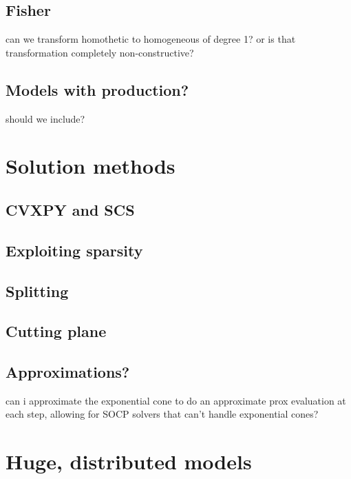\documentclass{article}
\begin{document}
\subsection{Fisher}
can we transform homothetic to homogeneous of degree 1? or is that transformation completely non-constructive?

\subsection{Models with production?}
should we include?

\section{Solution methods}

\subsection{CVXPY and SCS}
\subsection{Exploiting sparsity}
\subsection{Splitting}
\subsection{Cutting plane}
\subsection{Approximations?}
can i approximate the exponential cone to do an approximate prox evaluation
at each step, allowing for SOCP solvers that can't handle exponential cones?

\section{Huge, distributed models}
\end{document}
